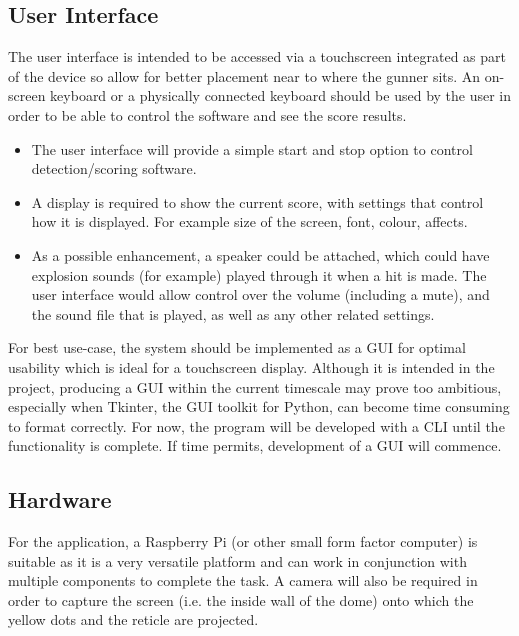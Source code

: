 \documentclass[final]{cmpreport_02}
\begin{document}
\subsection{User Interface}

The user interface is intended to be accessed via a touchscreen integrated as part of the device so allow for better placement near to where the gunner sits. An on-screen keyboard or a physically connected keyboard should be used by the user in order to be able to control the software and see the score results.
\begin{itemize}
	\item The user interface will provide a simple start and stop option to control detection/scoring software.
	\item A display is required to show the current score, with settings that control how it is displayed. For example size of the screen, font, colour, affects.
	\item As a possible enhancement, a speaker could be attached, which could have explosion sounds (for example) played through it when a hit is made. The user interface would allow control over the volume (including a mute), and the sound file that is played, as well as any other related settings.
\end{itemize}
\noindent
For best use-case, the system should be implemented as a GUI for optimal usability which is ideal for a touchscreen display. Although it is intended in the project, producing a GUI within the current timescale may prove too ambitious, especially when Tkinter, the GUI toolkit for Python, can become time consuming to format correctly. For now, the program will be developed with a CLI until the functionality is complete. If time permits, development of a GUI will commence.

\subsection{Hardware}

For the application, a Raspberry Pi (or other small form factor computer) is suitable as
it is a very versatile platform and can work in conjunction with multiple components to
complete the task. A camera will also be required in order to capture the screen (i.e. the inside wall of the dome) onto which the yellow dots and the reticle are projected.
\end{document}
